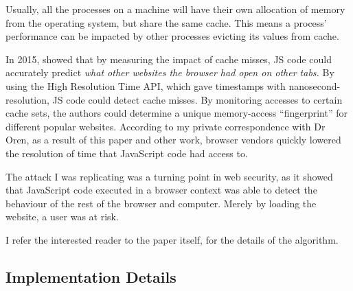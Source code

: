 \documentclass[a4paper,10pt,twocolumn]{article}
\theoremstyle{definition}
\newcommand*{\acronym}{\textsc}
\newcommand*{\API}{\acronym{Api}}
\begin{document}
Usually, all the processes on a machine will have their own allocation of memory
from the operating system, but share the same cache.
This means a process' performance can be impacted by other processes evicting
its values from cache.


In 2015, \textcite{Oren_KSK_2015} showed that by measuring the impact of cache
misses, JS code could accurately predict \emph{what other websites the
  browser had open on other tabs.}
By using the High Resolution Time API, which gave timestamps with
nanosecond-resolution, JS code could detect cache misses.
By monitoring accesses to certain cache sets, the authors could determine a
unique memory-access ``fingerprint'' for different popular websites.
According to my private correspondence with Dr Oren, as a result of this paper
and other work, browser vendors quickly lowered the resolution of time that
JavaScript code had access to.

The attack I was replicating was a turning point in web security, as it showed
that JavaScript code executed in a browser context was able to detect the
behaviour of the rest of the browser and computer.
Merely by loading the website, a user was at risk.

I refer the interested reader to the paper itself, for the details of the
algorithm.

\subsection{Implementation Details}
\end{document}
